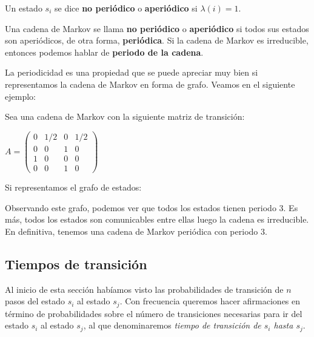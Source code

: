 \begin{definition}
Un estado $s_i$ se dice \textbf{no periódico} o \textbf{aperiódico} si $\lambda(i)=1$. 
\end{definition}
\begin{definition}
Una cadena de Markov se llama \textbf{no periódico} o \textbf{aperiódico} si todos sus estados son aperiódicos, de otra forma, \textbf{periódica}. Si la cadena de Markov es irreducible, entonces podemos hablar de \textbf{periodo de la cadena}.
\end{definition}
La periodicidad es una propiedad que se puede apreciar muy bien si representamos la cadena de Markov en forma de grafo. Veamos en el siguiente ejemplo:
\begin{exampleth}
Sea una cadena de Markov con la siguiente matriz de transición:
\begin{center}
    $A=\begin{pmatrix}
    0 & 1/2 & 0 & 1/2 \\
    0 & 0 & 1 & 0 \\
    1 & 0 & 0 & 0 \\
    0 & 0 & 1 & 0
    \end{pmatrix}$
\end{center}
Si representamos el grafo de estados:
    \begin{center}
    \end{center}
Observando este grafo, podemos ver que todos los estados tienen periodo 3. Es más, todos los estados son comunicables entre ellas luego la cadena es irreducible. En definitiva, tenemos una cadena de Markov periódica con periodo 3.
\end{exampleth}

\subsection{Tiempos de transición}
Al inicio de esta sección habíamos visto las probabilidades de transición de $n$ pasos del estado $s_i$ al estado $s_j$. Con frecuencia queremos hacer afirmaciones en término de probabilidades sobre el número de transiciones necesarias para ir del estado $s_i$ al estado $s_j$, al que denominaremos \textit{tiempo de transición de $s_i$ hasta $s_j$}.

